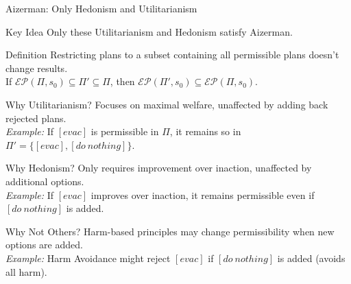 \documentclass[compress,xcolor=table]{beamer}
\begin{document}
\begin{frame}{Aizerman: Only Hedonism and Utilitarianism}
    \begin{block}{Key Idea}
        Only these Utilitarianism and Hedonism satisfy Aizerman.
    \end{block}
    \tiny
    \begin{block}{Definition}
        Restricting plans to a subset containing all permissible plans doesn't change results.\\
        If $\mathcal{EP}(\Pi, s_0) \subseteq \Pi' \subseteq \Pi$, then $\mathcal{EP}(\Pi', s_0) \subseteq \mathcal{EP}(\Pi, s_0)$.
    \end{block}

    \begin{block}{Why Utilitarianism?}
        Focuses on maximal welfare, unaffected by adding back rejected plans.\\
        \textit{Example:} If $[evac]$ is permissible in $\Pi$, it remains so in $\Pi' = \{[evac], [do\ nothing]\}$.
    \end{block}

    \begin{block}{Why Hedonism?}
        Only requires improvement over inaction, unaffected by additional options.\\
        \textit{Example:} If $[evac]$ improves over inaction, it remains permissible even if $[do\ nothing]$ is added.
    \end{block}

    \begin{block}{Why Not Others?}
        Harm-based principles may change permissibility when new options are added.\\
        \textit{Example:} Harm Avoidance might reject $[evac]$ if $[do\ nothing]$ is added (avoids all harm).
    \end{block}
\end{frame}
\end{document}

